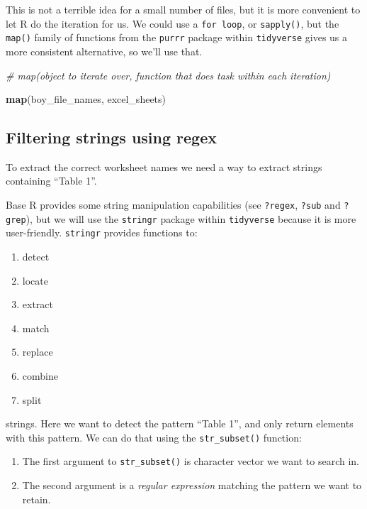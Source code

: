 \documentclass[
]{book}
\newenvironment{Shaded}{\begin{snugshade}}{\end{snugshade}}
\newcommand{\CommentTok}[1]{\textcolor[rgb]{0.56,0.35,0.01}{\textit{#1}}}
\newcommand{\KeywordTok}[1]{\textcolor[rgb]{0.13,0.29,0.53}{\textbf{#1}}}
\newcommand{\NormalTok}[1]{#1}
\providecommand{\tightlist}{%
  \setlength{\itemsep}{0pt}\setlength{\parskip}{0pt}}
\begin{document}
This is not a terrible idea for a small number of files, but it is
more convenient to let R do the iteration for us. We could use a \texttt{for\ loop},
or \texttt{sapply()}, but the \texttt{map()} family of functions from the \texttt{purrr}
package within \texttt{tidyverse} gives us a more consistent alternative,
so we'll use that.

\begin{Shaded}
\begin{Highlighting}[]
\CommentTok{# map(object to iterate over, function that does task within each iteration)}

\KeywordTok{map}\NormalTok{(boy_file_names, excel_sheets)}
\end{Highlighting}
\end{Shaded}

\hypertarget{filtering-strings-using-regex}{%
\subsection{Filtering strings using regex}\label{filtering-strings-using-regex}}

To extract the correct worksheet names we need a way to extract
strings containing ``Table 1''.

Base R provides some string manipulation capabilities
(see \texttt{?regex}, \texttt{?sub} and \texttt{?grep}), but we will use the
\texttt{stringr} package within \texttt{tidyverse} because it is more
user-friendly. \texttt{stringr} provides functions to:

\begin{enumerate}
\def\labelenumi{\arabic{enumi}.}
\tightlist
\item
  detect
\item
  locate
\item
  extract
\item
  match
\item
  replace
\item
  combine
\item
  split
\end{enumerate}

strings. Here we want to detect the pattern ``Table 1'', and only
return elements with this pattern. We can do that using the
\texttt{str\_subset()} function:

\begin{enumerate}
\def\labelenumi{\arabic{enumi}.}
\tightlist
\item
  The first argument to \texttt{str\_subset()} is character vector we want to search in.
\item
  The second argument is a \emph{regular expression} matching the pattern we want to retain.
\end{enumerate}
\end{document}
